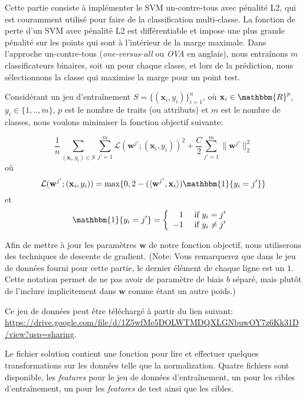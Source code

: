 {}{
Cette partie consiste à implémenter le SVM un-contre-tous avec pénalité L2, qui est couramment utilisé pour faire de la classification multi-classe. La fonction de perte d'un SVM avec pénalité L2 est différentiable et impose une plus grande pénalité sur les points qui sont à l'intérieur de la marge maximale. Dans l'approche un-contre-tous (\textit{one-versus-all} ou \textit{OVA} en anglais), nous entraînons $m$ classificateurs binaires, soit un pour chaque classe, et lors de la prédiction, nous sélectionnons la classe qui maximise la marge pour un point test.

Considérant un jeu d'entraînement $S = \{(\mathbf{x}_i, y_i) \}_{i=1}^n$, où $\mathbf{x}_i \in \mathbbm{R}^p$, $y_i \in \{1,..,m\}$, $p$ est le nombre de traits (ou attributs) et $m$ est le nombre de classes, nous voulons minimiser la fonction objectif suivante:

\begin{equation*}
 \frac{1}{n}\sum_{(\mathbf{x}_i, y_i) \in S} \sum_{j'=1}^{m} \mathcal{L}(\mathbf{w}^{j'}; (\mathbf{x}_i, y_i))^2 + \frac{C}{2}\sum_{j'=1}^{m} \lVert \mathbf{w}^{j'} \rVert_2^2
\end{equation*}
où
\begin{equation*}
\mathcal{L}(\mathbf{w}^{j'}; (\mathbf{x}_i, y_i)) = \text{max}\{0, 2 - (\langle \mathbf{w}^{j'}, \mathbf{x}_i \rangle)\mathbbm{1}\{y_i=j'\}  \}
\end{equation*}
et
\begin{equation*}
    \mathbbm{1}\{y_i=j'\} = \left\{ \begin{array}{rl}
            1 &\mbox{ if $y_i=j'$ } \\
            -1 &\mbox{ if $y_i \neq j'$ }
            \end{array} \right.
\end{equation*}

Afin de mettre à jour les paramètres $\mathbf{w}$ de notre fonction objectif, nous utiliserons des techniques de descente de gradient. (Note: Vous remarquerez que dans le jeu de données fourni pour cette partie, le dernier élément de chaque ligne est un $1$. Cette notation permet de ne pas avoir de paramètre de biais $b$ séparé, mais plutôt de l'inclure implicitement dans $\mathbf{w}$ comme étant un autre poids.)

Ce jeu de données peut être téléchargé à partir du lien suivant: \url{https://drive.google.com/file/d/1Z5wfMe5DOLWTMDQXLGNbuwOY7z6Kk31D/view?usp=sharing}.
}
Le fichier solution contient une fonction pour lire et effectuer quelques transformations sur les données telle que la normalization. Quatre fichiers sont disponible, les \textit{features} pour le jeu de données d'entraînement, un pour les cibles d'entraînement, un pour les \textit{features} de test ainsi que les cibles.
